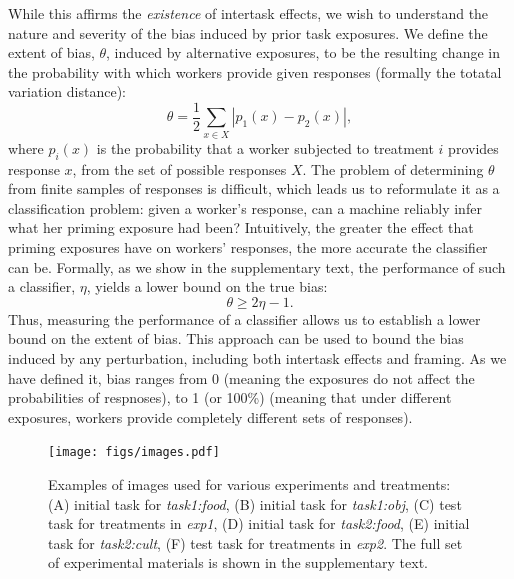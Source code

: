 \documentclass[12pt]{article}
\begin{document}
While this affirms the \textit{existence} of intertask effects, we wish to
understand the nature and severity of the bias induced by prior task 
exposures.  
We define the extent of bias, $\theta$, induced by alternative exposures, to 
be the resulting change in the probability with which workers provide given 
responses (formally the totatal variation distance):
\begin{equation}
	\theta = \frac{1}{2}\sum_{x \in X} \left| p_1(x) - p_2(x) \right|,
\end{equation}
where $p_i(x)$ is the probability that a worker subjected to treatment $i$
provides response $x$, from the set of possible responses $X$.
The problem of determining $\theta$ from finite samples of responses is 
difficult, which leads us to reformulate it as a classification problem: 
given a worker's 
response, can a machine reliably infer what her priming exposure had been?  
Intuitively, the greater the effect that priming exposures have on workers' 
responses, the more accurate the classifier can be.  Formally, as we show
in the supplementary text, the performance of such a classifier, $\eta$,
yields a lower bound on the true bias:
\begin{equation}
	\theta \geq 2\eta - 1.
	\label{l1}
\end{equation}
Thus, measuring the performance of a classifier allows us to establish a
lower bound on the extent of bias. This approach can be used to bound the 
bias induced by any perturbation, including both intertask effects and 
framing.  As we have defined it, bias ranges from 0 (meaning the exposures 
do not affect the probabilities of respnoses), to 1 
(or 100\%) (meaning that under different exposures, workers provide completely
different sets of responses).

\begin{figure}
	\centering
	\texttt{[image: figs/images.pdf]}
	\caption{
		Examples of images used for various experiments and treatments:
		(A) initial task for \textit{task1:food}, (B) initial task for 
		\textit{task1:obj}, (C) test task for treatments in \textit{exp1}, 
		(D) initial task for \textit{task2:food}, 
		(E) initial task for \textit{task2:cult},  
		(F) test task for treatments in \textit{exp2}.  
		The full set of experimental materials is shown in the 
		supplementary text.
	}

	\label{fig:task}
\end{figure}
\end{document}
